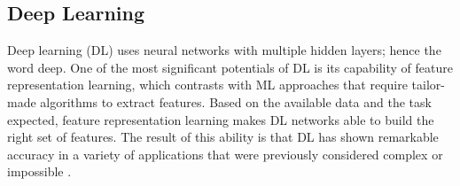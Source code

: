 \documentclass[12pt]{diazessay}
\newcounter{subsubsubsection}[subsubsection]
\begin{document}

    \subsection{Deep Learning}
    \hspace{0.7cm} Deep learning (DL) uses neural networks with multiple hidden layers; hence the word deep. One of the most significant potentials of DL is its capability of feature representation learning, which contrasts with ML approaches that require tailor-made algorithms to extract features. Based on the available data and the task expected, feature representation learning makes DL networks able to build the right set of features. The result of this ability is that  DL has shown remarkable accuracy in a variety of applications that were previously considered complex or impossible \cite{senthilnathan2022deep}.
    
\end{document}
